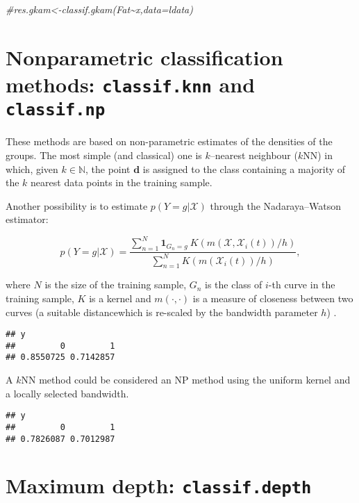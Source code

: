 \documentclass[
]{book}
\newenvironment{Shaded}{\begin{snugshade}}{\end{snugshade}}
\newcommand{\CommentTok}[1]{\textcolor[rgb]{0.56,0.35,0.01}{\textit{#1}}}
\begin{document}
\begin{Shaded}
\begin{Highlighting}[]
\CommentTok{\#res.gkam\textless{}{-}classif.gkam(Fat\textasciitilde{}x,data=ldata)}
\end{Highlighting}
\end{Shaded}

\hypertarget{nonparametric-classification-methods-classif.knn-and-classif.np-ferraty2003}{%
\section{\texorpdfstring{Nonparametric classification methods: \texttt{classif.knn} and \texttt{classif.np} \citep{Ferraty2003}}{Nonparametric classification methods: classif.knn and classif.np {[}@Ferraty2003{]}}}\label{nonparametric-classification-methods-classif.knn-and-classif.np-ferraty2003}}

These methods are based on non-parametric estimates of the densities of the groups. The most simple (and classical) one is \(k\)--nearest neighbour (\(k\)NN) in which, given \(k \in \mathbb{N}\), the point \(\mathbf{d}\) is assigned to the class containing a majority of the \(k\) nearest data points in the training sample.

Another possibility is to estimate \(p(Y=g|\mathcal{X})\) through the Nadaraya--Watson estimator:

\[p(Y=g|\mathcal{X})=\frac{\sum_{n=1}^N \mathbf{1}_{G_n=g}\  K\left(m(\mathcal{X},\mathcal{X}_i(t))/h\right)}{\sum_{n=1}^N K\left(m(\mathcal{X}_i(t))/h\right)},\]

where \(N\) is the size of the training sample, \(G_n\) is the class of \(i\)-th curve in the training sample, \(K\) is a kernel and \(m(\cdot,\cdot )\) is a measure of closeness between two curves (a suitable distancewhich is re-scaled by the bandwidth parameter \(h\)) .

\begin{verbatim}
## y
##         0         1 
## 0.8550725 0.7142857
\end{verbatim}

A \(k\)NN method could be considered an NP method using the uniform kernel and a locally selected bandwidth.

\begin{verbatim}
## y
##         0         1 
## 0.7826087 0.7012987
\end{verbatim}

\hypertarget{maximum-depth-classif.depth-li2012}{%
\section{\texorpdfstring{Maximum depth: \texttt{classif.depth} \citep{Li2012}}{Maximum depth: classif.depth {[}@Li2012{]}}}\label{maximum-depth-classif.depth-li2012}}
\end{document}
